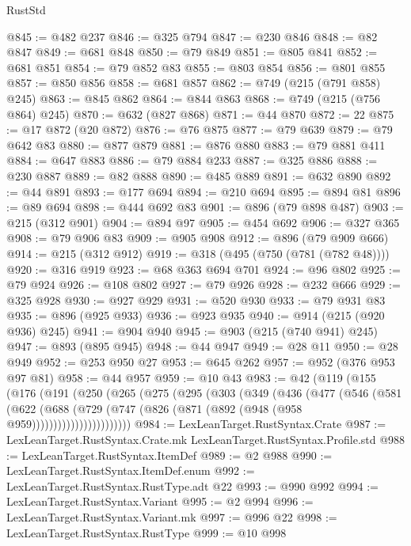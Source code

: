 \begin{lexlean}{RustStd}
\begin{coremodule}
@845 := @482 @237
@846 := @325 @794
@847 := @230 @846
@848 := @82 @847
@849 := @681 @848
@850 := @79 @849
@851 := @805 @841
@852 := @681 @851
@854 := @79 @852 @83
@855 := @803 @854
@856 := @801 @855
@857 := @850 @856
@858 := @681 @857
@862 := @749 (@215 (@791 @858) @245)
@863 := @845 @862
@864 := @844 @863
@868 := @749 (@215 (@756 @864) @245)
@870 := @632 (@827 @868)
@871 := @44 @870
@872 := 22
@875 := @17 @872 (@20 @872)
@876 := @76 @875
@877 := @79 @639
@879 := @79 @642 @83
@880 := @877 @879
@881 := @876 @880
@883 := @79 @881 @411
@884 := @647 @883
@886 := @79 @884 @233
@887 := @325 @886
@888 := @230 @887
@889 := @82 @888
@890 := @485 @889
@891 := @632 @890
@892 := @44 @891
@893 := @177 @694
@894 := @210 @694
@895 := @894 @81
@896 := @89 @694
@898 := @444 @692 @83
@901 := @896 (@79 @898 @487)
@903 := @215 (@312 @901)
@904 := @894 @97
@905 := @454 @692
@906 := @327 @365
@908 := @79 @906 @83
@909 := @905 @908
@912 := @896 (@79 @909 @666)
@914 := @215 (@312 @912)
@919 := @318 (@495 (@750 (@781 (@782 @48))))
@920 := @316 @919
@923 := @68 @363 @694 @701
@924 := @96 @802
@925 := @79 @924
@926 := @108 @802
@927 := @79 @926
@928 := @232 @666
@929 := @325 @928
@930 := @927 @929
@931 := @520 @930
@933 := @79 @931 @83
@935 := @896 (@925 @933)
@936 := @923 @935
@940 := @914 (@215 (@920 @936) @245)
@941 := @904 @940
@945 := @903 (@215 (@740 @941) @245)
@947 := @893 (@895 @945)
@948 := @44 @947
@949 := @28 @11
@950 := @28 @949
@952 := @253 @950 @27
@953 := @645 @262
@957 := @952 (@376 @953 @97 @81)
@958 := @44 @957
@959 := @10 @43
@983 := @42
    (@119
      (@155
        (@176
          (@191
            (@250
              (@265
                (@275
                  (@295
                    (@303
                      (@349
                        (@436
                          (@477
                            (@546
                              (@581
                                (@622
                                  (@688
                                    (@729
                                      (@747
                                        (@826 (@871 (@892 (@948 (@958 @959)))))))))))))))))))))))
@984 := LexLeanTarget.RustSyntax.Crate
@987 := LexLeanTarget.RustSyntax.Crate.mk LexLeanTarget.RustSyntax.Profile.std
@988 := LexLeanTarget.RustSyntax.ItemDef
@989 := @2 @988
@990 := LexLeanTarget.RustSyntax.ItemDef.enum
@992 := LexLeanTarget.RustSyntax.RustType.adt @22
@993 := @990 @992
@994 := LexLeanTarget.RustSyntax.Variant
@995 := @2 @994
@996 := LexLeanTarget.RustSyntax.Variant.mk
@997 := @996 @22
@998 := LexLeanTarget.RustSyntax.RustType
@999 := @10 @998

\end{coremodule}
\end{lexlean}
